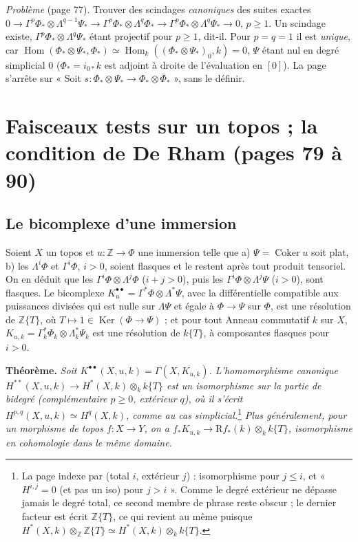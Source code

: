 \documentclass[11pt,a4paper]{article}
\begin{document}
\emph{Problème} (page 77). Trouver des scindages \emph{canoniques} des suites
exactes $0 \to \Gamma^p\Phi_* \otimes \Lambda^{q-1}\Psi_* \to \Gamma^p\Phi_*
\otimes \Lambda^q\Phi_* \to \Gamma^p\Phi_* \otimes \Lambda^q\Psi_* \to 0$,
$p \geq 1$. Un scindage existe, $\Gamma^p\Phi_* \otimes \Lambda^q\Psi_*$ étant
projectif pour $p \geq 1$, dit-il. Pour $p = q = 1$ il est \emph{unique}, car
$\operatorname{Hom}(\Phi_* \otimes \Psi_*, \Phi_*) \simeq
\operatorname{Hom}_k((\Phi_*\otimes\Psi_*)_0, k) = 0$, $\Psi$ étant nul en
degré simplicial $0$ ($\Phi_* = i_{0*}k$ est adjoint à droite de l'évaluation
en $[0]$). La page s'arrête sur « Soit $s : \Phi_* \otimes \Psi_* \to \Phi_*
\otimes \overline{\Phi}_*$ », sans le définir.

\section*{Faisceaux tests sur un topos ; la condition de De Rham (pages 79 à 90)}

\subsection*{Le bicomplexe d'une immersion}

Soient $X$ un topos et $u : \mathbb{Z} \to \Phi$ une immersion telle que a)
$\Psi = \operatorname{Coker} u$ soit plat, b) les $\Lambda^i\Phi$ et $\Gamma^i
\Phi$, $i > 0$, soient flasques et le restent après tout produit tensoriel. On
en déduit que les $\Gamma^i\Phi \otimes \Lambda^j\Phi$ ($i + j > 0$), puis les
$\Gamma^i\Phi \otimes \Lambda^j\Psi$ ($i > 0$), sont flasques. Le bicomplexe
$K^{\bullet\bullet}_u = \Gamma^*\Phi \otimes \Lambda^*\Psi$, avec la
différentielle compatible aux puissances divisées qui est nulle sur
$\Lambda\Psi$ et égale à $\Phi \to \Psi$ sur $\Phi$, est une résolution de
$\mathbb{Z}\{T\}$, où $T \mapsto 1 \in \operatorname{Ker}(\Phi \to \Psi)$ ; et
pour tout Anneau commutatif $k$ sur $X$, $K_{u,k} = \Gamma^*_k\Phi_k \otimes
\Lambda^*_k\Psi_k$ est une résolution de $k\{T\}$, à composantes flasques pour
$i > 0$.

\textbf{Théorème.} \emph{Soit $K^{\bullet\bullet}(X, u, k) = \Gamma(X,
K_{u,k})$. L'homomorphisme canonique $H^{**}(X, u, k) \to H^*(X, k) \otimes_k
k\{T\}$ est un isomorphisme sur la partie de bidegré (complémentaire $p \geq
0$, extérieur $q$), où il s'écrit $H^{p,q}(X,u,k) \simeq H^q(X,k)$, comme au
cas simplicial.}\footnote{La page indexe par (total $i$, extérieur $j$) : isomorphisme
pour $j \leq i$, et « $H^{i,j} = 0$ (et pas un iso) pour $j > i$ ». Comme le
degré extérieur ne dépasse jamais le degré total, ce second membre de phrase
reste obscur ; le dernier facteur est écrit $\mathbb{Z}\{T\}$, ce qui revient
au même puisque $H^*(X,k) \otimes_{\mathbb{Z}} \mathbb{Z}\{T\} \simeq H^*(X,k)
\otimes_k k\{T\}$.} \emph{Plus généralement, pour un morphisme de topos $f : X
\to Y$, on a $f_* K_{u,k} \to \mathrm{R}f_*(k) \otimes_k k\{T\}$, isomorphisme
en cohomologie dans le même domaine.}
\end{document}
